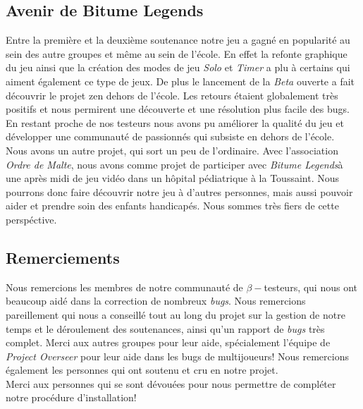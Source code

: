 \documentclass[a4paper,12pt]{article}
\newcommand{\btmlgs}{\textsl{Bitume Legends}}
\begin{document}
    \subsection{Avenir de Bitume Legends}
        Entre la première et la deuxième soutenance notre jeu a gagné en popularité au sein des autre groupes et même au sein de l'école. En effet la refonte graphique du jeu ainsi que la création des modes de jeu \textsl{Solo} et \textsl{Timer} a plu à certains qui aiment également ce type de jeux. De plus le lancement de la \textsl{Beta} ouverte a fait découvrir le projet zen dehors de l'école. Les retours étaient globalement très positifs et nous permirent une découverte et une résolution plus facile des bugs. En restant proche de nos testeurs nous avons pu améliorer la qualité du jeu et développer une communauté de passionnés qui subsiste en dehors de l'école.\\
        Nous avons un autre projet, qui sort un peu de l'ordinaire. Avec l'association \textsl{Ordre de Malte}, nous avons comme projet de participer avec \btmlgs\;à une après midi de jeu vidéo dans un hôpital pédiatrique à la Toussaint. Nous pourrons donc faire découvrir notre jeu à d'autres personnes, mais aussi pouvoir aider et prendre soin des enfants handicapés. Nous sommes très fiers de cette perspéctive.
        
    \subsection{Remerciements}
        Nous remercions les membres de notre communauté de \(\beta-\)testeurs, qui nous ont beaucoup aidé dans la
        correction de nombreux \textsl{bugs}. Nous remercions pareillement  qui nous a conseillé tout au long du projet sur la gestion de notre temps et le déroulement des soutenances, ainsi qu'un rapport de \textsl{bugs} très complet.
        Merci aux autres groupes pour leur aide, spécialement l'équipe de \textsl{Project Overseer} pour leur aide dans les bugs de multijoueurs! Nous remercions également les personnes qui ont soutenu et cru en notre projet.\\
        Merci aux personnes qui se sont dévouées pour nous permettre de compléter notre procédure d'installation! \\
    
\end{document}
